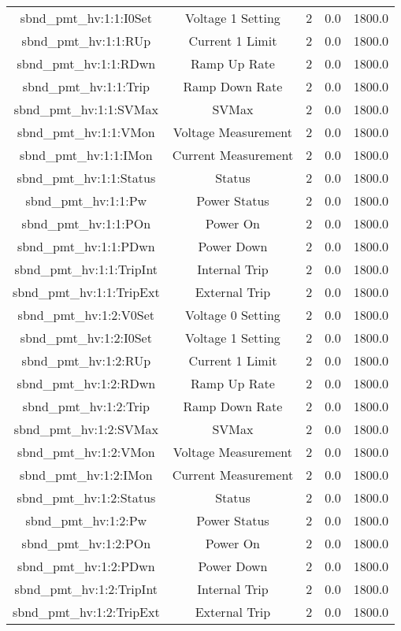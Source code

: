 \begin{table}[ptb]
\begin{tabular}{c | c c c c}
sbnd_pmt_hv:1:1:I0Set & Voltage 1 Setting & 2 & 0.0 & 1800.0\\ 
sbnd_pmt_hv:1:1:RUp & Current 1 Limit & 2 & 0.0 & 1800.0\\ 
sbnd_pmt_hv:1:1:RDwn & Ramp Up Rate & 2 & 0.0 & 1800.0\\ 
sbnd_pmt_hv:1:1:Trip & Ramp Down Rate & 2 & 0.0 & 1800.0\\ 
sbnd_pmt_hv:1:1:SVMax & SVMax & 2 & 0.0 & 1800.0\\ 
sbnd_pmt_hv:1:1:VMon & Voltage Measurement & 2 & 0.0 & 1800.0\\ 
sbnd_pmt_hv:1:1:IMon & Current Measurement & 2 & 0.0 & 1800.0\\ 
sbnd_pmt_hv:1:1:Status & Status & 2 & 0.0 & 1800.0\\ 
sbnd_pmt_hv:1:1:Pw & Power Status & 2 & 0.0 & 1800.0\\ 
sbnd_pmt_hv:1:1:POn & Power On & 2 & 0.0 & 1800.0\\ 
sbnd_pmt_hv:1:1:PDwn & Power Down & 2 & 0.0 & 1800.0\\ 
sbnd_pmt_hv:1:1:TripInt & Internal Trip & 2 & 0.0 & 1800.0\\ 
sbnd_pmt_hv:1:1:TripExt & External Trip & 2 & 0.0 & 1800.0\\ 
sbnd_pmt_hv:1:2:V0Set & Voltage 0 Setting & 2 & 0.0 & 1800.0\\ 
sbnd_pmt_hv:1:2:I0Set & Voltage 1 Setting & 2 & 0.0 & 1800.0\\ 
sbnd_pmt_hv:1:2:RUp & Current 1 Limit & 2 & 0.0 & 1800.0\\ 
sbnd_pmt_hv:1:2:RDwn & Ramp Up Rate & 2 & 0.0 & 1800.0\\ 
sbnd_pmt_hv:1:2:Trip & Ramp Down Rate & 2 & 0.0 & 1800.0\\ 
sbnd_pmt_hv:1:2:SVMax & SVMax & 2 & 0.0 & 1800.0\\ 
sbnd_pmt_hv:1:2:VMon & Voltage Measurement & 2 & 0.0 & 1800.0\\ 
sbnd_pmt_hv:1:2:IMon & Current Measurement & 2 & 0.0 & 1800.0\\ 
sbnd_pmt_hv:1:2:Status & Status & 2 & 0.0 & 1800.0\\ 
sbnd_pmt_hv:1:2:Pw & Power Status & 2 & 0.0 & 1800.0\\ 
sbnd_pmt_hv:1:2:POn & Power On & 2 & 0.0 & 1800.0\\ 
sbnd_pmt_hv:1:2:PDwn & Power Down & 2 & 0.0 & 1800.0\\ 
sbnd_pmt_hv:1:2:TripInt & Internal Trip & 2 & 0.0 & 1800.0\\ 
sbnd_pmt_hv:1:2:TripExt & External Trip & 2 & 0.0 & 1800.0\\ 

\end{tabular}
\end{table}
